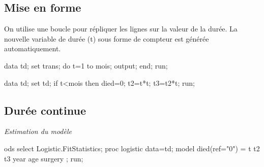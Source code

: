 \documentclass[
  12pt,
  letterpaper,
  DIV=11,
  numbers=noendperiod,
  onepage,
  openany]{scrreprt}
\newenvironment{Shaded}{\begin{snugshade}}{\end{snugshade}}
\newcommand{\AttributeTok}[1]{\textcolor[rgb]{0.80,0.80,0.80}{#1}}
\newcommand{\ControlFlowTok}[1]{\textcolor[rgb]{0.94,0.87,0.69}{#1}}
\newcommand{\DecValTok}[1]{\textcolor[rgb]{0.86,0.86,0.80}{#1}}
\newcommand{\FunctionTok}[1]{\textcolor[rgb]{0.94,0.94,0.56}{#1}}
\newcommand{\NormalTok}[1]{\textcolor[rgb]{0.80,0.80,0.80}{#1}}
\newcommand{\OtherTok}[1]{\textcolor[rgb]{0.94,0.94,0.56}{#1}}
\newcommand{\SpecialCharTok}[1]{\textcolor[rgb]{0.86,0.64,0.64}{#1}}
\newcommand{\StringTok}[1]{\textcolor[rgb]{0.80,0.58,0.58}{#1}}
\begin{document}
\hypertarget{mise-en-forme}{%
\subsection{Mise en forme}\label{mise-en-forme}}

On utilise une boucle pour répliquer les lignes sur la valeur de la
durée. La nouvelle variable de durée (t) sous forme de compteur est
générée automatiquement.

\begin{Shaded}
\begin{Highlighting}[]
\NormalTok{data td; set trans; }
\NormalTok{do t}\OtherTok{=}\DecValTok{1}\NormalTok{ to mois; }
\NormalTok{     output; }
\NormalTok{     end; run;}
     
\NormalTok{data td; set td;}
\ControlFlowTok{if}\NormalTok{ t}\SpecialCharTok{\textless{}}\NormalTok{mois then died}\OtherTok{=}\DecValTok{0}\NormalTok{;}
\NormalTok{t2}\OtherTok{=}\NormalTok{t}\SpecialCharTok{*}\NormalTok{t;}
\NormalTok{t3}\OtherTok{=}\NormalTok{t2}\SpecialCharTok{*}\NormalTok{t; run;}
\end{Highlighting}
\end{Shaded}

\hypertarget{duruxe9e-continue}{%
\subsection{Durée continue}\label{duruxe9e-continue}}

\emph{Estimation du modèle}

\begin{Shaded}
\begin{Highlighting}[]
\NormalTok{ods select Logistic.FitStatistics;}
\NormalTok{proc logistic data}\OtherTok{=}\NormalTok{td;}
\NormalTok{model }\FunctionTok{died}\NormalTok{(}\AttributeTok{ref=}\StringTok{"0"}\NormalTok{) }\OtherTok{=}\NormalTok{ t t2 t3 year age surgery  ; run;}
\end{Highlighting}
\end{Shaded}
\end{document}
